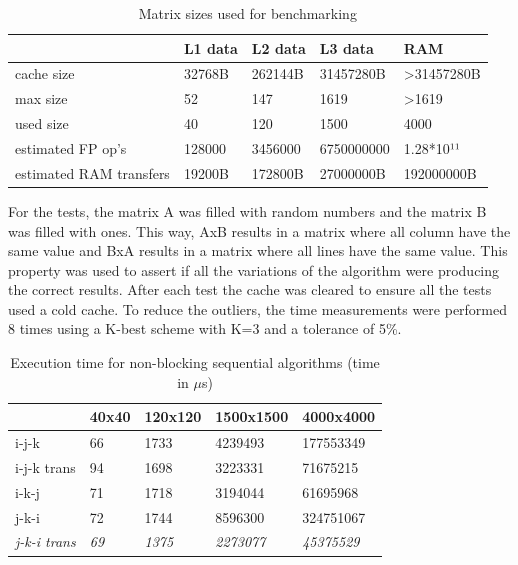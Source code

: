 \documentclass[a4paper]{report}
\begin{document}
\begin{table}[H]
\centering
\begin{tabular}{|l|l|l|l|l|}
\hline
           & L1 data & L2 data & L3 data  & RAM                        \\ \hline
cache size & 32768B   & 262144B  & 31457280B & \textgreater{}31457280B \\ \hline
max size   & 52      & 147     & 1619     & \textgreater{}1619         \\ \hline
used size  & 40      & 120     & 1500     & 4000                       \\ \hline
estimated FP op's & 128000  & 3456000 & 6750000000 & 1.28*10¹¹         \\ \hline
estimated RAM transfers & 19200B  & 172800B & 27000000B & 192000000B   \\ \hline
\end{tabular}
\caption{Matrix sizes used for benchmarking}
\end{table}

For the tests, the matrix A was filled with random numbers and the matrix B was
filled with ones. This way, AxB results in a matrix where all column have the
same value and BxA results in a matrix where all lines have the same value. This
property was used to assert if all the variations of the algorithm were producing
the correct results. After each test the cache was cleared to ensure all the
tests used a cold cache. To reduce the outliers, the time measurements were
performed 8 times using a K-best scheme with K=3 and a tolerance of 5\%.

\begin{table}[H]
\centering
\begin{tabular}{|l|l|l|l|l|}
\hline
            & 40x40 & 120x120 & 1500x1500 & 4000x4000 \\ \hline
i-j-k       & 66    & 1733    & 4239493   & 177553349 \\ \hline
i-j-k trans & 94    & 1698    & 3223331   & 71675215  \\ \hline
i-k-j       & 71    & 1718    & 3194044   & 61695968  \\ \hline
j-k-i       & 72    & 1744    & 8596300   & 324751067 \\ \hline
\textit{j-k-i trans} & \textit{69}    & \textit{1375}    & \textit{2273077}   &
\textit{45375529}  \\ \hline
\end{tabular}
\caption{Execution time for non-blocking sequential algorithms (time in $\mu$s)}
\end{table}
\end{document}
